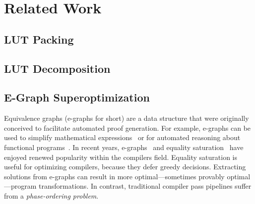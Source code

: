 \section{Related Work}\label{sec:relatedwork}

\subsection{LUT Packing}\label{sec:relatedwork:packing}

\subsection{LUT Decomposition}\label{sec:relatedwork:decomp}

\subsection{E-Graph Superoptimization}\label{sec:relatedwork:egraph}
Equivalence graphs (e-graphs for short) are a data structure that were
originally conceived to facilitate automated proof generation. For example,
e-graphs can be used to simplify mathematical expressions~\cite{egraphmath} or
for automated reasoning about functional programs~\cite{cclemma}. In recent
years, e-graphs~\cite{eggpaper} and equality saturation~\cite{eqsat} have
enjoyed renewed popularity within the compilers field. Equality saturation is
useful for optimizing compilers, because they defer greedy decisions.
Extracting solutions from e-graphs can result in more optimal---sometimes
provably optimal---program transformations. In contrast, traditional compiler
pass pipelines suffer from a \textit{phase-ordering problem}.
